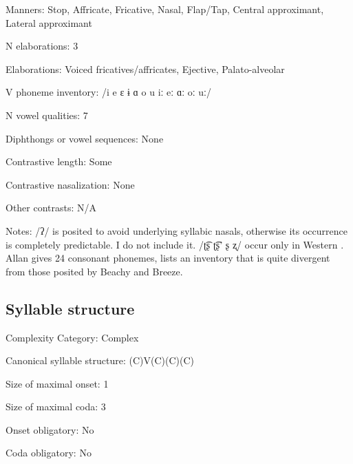 {\begin{appendixdesc}
\item[Manners:] Stop, Affricate, Fricative, Nasal, Flap/Tap, Central approximant, Lateral approximant

\item[N elaborations:] 3

\item[Elaborations:] Voiced fricatives/affricates, Ejective, Palato-alveolar

\item[V phoneme inventory:] /i e ɛ ɨ ɑ o u iː eː ɑː oː uː/

\item[N vowel qualities:] 7

\item[Diphthongs or vowel sequences:] None

\item[Contrastive length:] Some

\item[Contrastive nasalization:] None

\item[Other contrasts:] N/A

\item[Notes:] /ʔ/ is posited to avoid underlying syllabic nasals, otherwise its occurrence is completely predictable. I do not include it. /ʈ͡ʂ ʈ͡ʂ’ ʂ ʐ/ occur only in Western  \citep{Beachy2005}. Allan gives 24 consonant phonemes, lists an inventory that is quite divergent from those posited by Beachy and Breeze.
\end{appendixdesc}
\subsection*{Syllable structure}
\begin{appendixdesc}

\item[Complexity Category:] Complex

\item[Canonical syllable structure:] (C)V(C)(C)(C) \citep[38--46]{Beachy2005}

\item[Size of maximal onset:] 1

\item[Size of maximal coda:] 3

\item[Onset obligatory:] No

\item[Coda obligatory:] No


\end{appendixdesc}}
